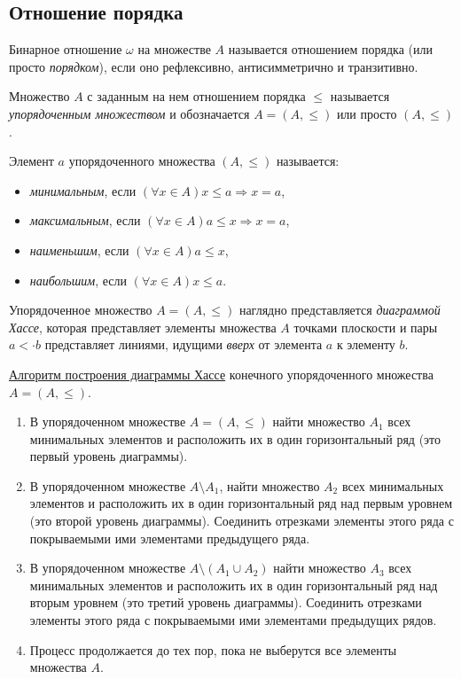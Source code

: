 \documentclass[bachelor, och, labwork]{shiza}
\begin{document}
	

    \subsection{Отношение порядка}
	

	Бинарное отношение $\omega $ на множестве $A$ называется отношением порядка (или просто \textit{порядком}), если оно рефлексивно, антисимметрично и транзитивно.
	
	Множество $A$ с заданным на нем отношением порядка $\leq$ называется \textit{упорядоченным множеством} и обозначается $A = (A,\leq)$ или просто $(A,\leq)$.
	
	Элемент $a$ упорядоченного множества $(A,\leq)$ называется:

	\begin{itemize}
		\item \textit{минимальным}, если $(\forall x \in A) x \leq a \Rightarrow x = a$,
		\item \textit{максимальным}, если $(\forall x \in A) a \leq x \Rightarrow x = a$,
		\item \textit{наименьшим}, если $(\forall x \in A) a \leq x$,
		\item \textit{наибольшим}, если $(\forall x \in A) x \leq a$.
	\end{itemize}

	Упорядоченное множество $A = (A,\leq)$	наглядно представляется \textit{диаграммой Хассе}, которая представляет элементы множества $A$ точками плоскости и пары $a<\cdot b$ представляет линиями, идущими \textit{вверх} от элемента $a$ к элементу $b$.
		
	\underline{Алгоритм построения диаграммы Хассе} конечного упорядоченного множества $A = (A,\leq)$.
	
	\begin{enumerate}
		\item В упорядоченном множестве $A = (A,\leq)$ найти множество $A_1$ всех минимальных элементов и расположить их в один горизонтальный ряд (это первый уровень диаграммы).
		\item В упорядоченном множестве $A \setminus A_1$, найти множество $A_2$ всех минимальных элементов и
		расположить их в один горизонтальный ряд над первым уровнем (это второй уровень диаграммы). Соединить
		отрезками элементы этого ряда с покрываемыми ими элементами предыдущего ряда.
		\item В упорядоченном множестве $A \setminus (A_1 \cup A_2)$ найти множество $A_3$ всех минимальных
		элементов и расположить их в один горизонтальный ряд над вторым уровнем (это третий уровень диаграммы).
		Соединить отрезками элементы этого ряда с покрываемыми ими элементами предыдущих рядов.
		\item Процесс продолжается до тех пор, пока не выберутся все элементы множества $A$.
	\end{enumerate}	
\end{document}
